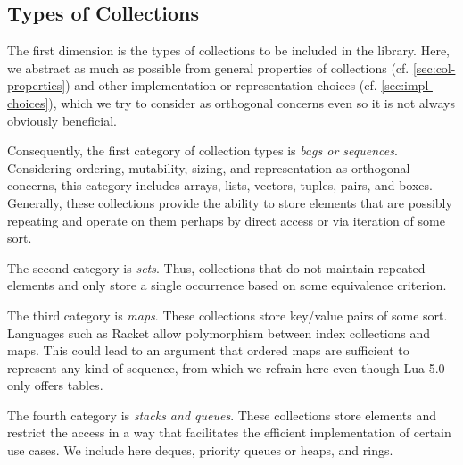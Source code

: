 \documentclass[sigconf, 10pt]{acmart}
\begin{document}
\subsection{Types of Collections}
\label{sec:col-types}

The first dimension is the types of collections to be included in the library.
Here, we abstract as much as possible
from general properties of collections (cf. \cref{sec:col-properties})
and other implementation or representation choices
(cf. \cref{sec:impl-choices}),
which we try to consider as orthogonal concerns
even so it is not always obviously beneficial.

Consequently,
the first category of collection types is \emph{bags or sequences}.
Considering ordering, mutability, sizing, and representation
as orthogonal concerns,
this category includes arrays, lists, vectors, tuples, pairs, and boxes.
Generally, these collections provide the ability to store elements
that are possibly repeating
and operate on them perhaps by direct access or via iteration of some sort.

The second category is \emph{sets}.
Thus, collections that do not maintain repeated elements
and only store a single occurrence based on some equivalence criterion.

The third category is \emph{maps}.
These collections store key/value pairs of some sort.
Languages such as Racket allow polymorphism between index collections and maps.
This could lead to an argument that ordered maps are sufficient to represent
any kind of sequence,
from which we refrain here even though Lua 5.0 only offers tables\citep{The_implementation_of_lua}.

The fourth category is \emph{stacks and queues}.
These collections store elements
and restrict the access in a way
that facilitates the efficient implementation of certain use cases.
We include here deques, priority queues or heaps, and rings.
\end{document}
